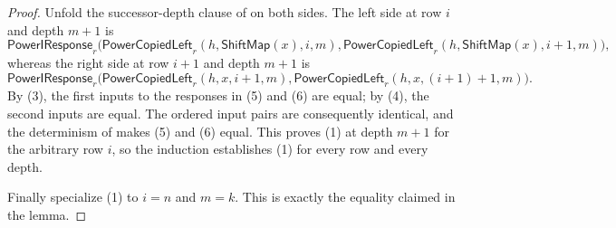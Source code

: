\begin{proof}
Unfold the successor-depth clause of  on both
sides.  The left side at row $i$ and depth $m+1$ is
\[
\mathsf{PowerIResponse}_r\bigl(
 \mathsf{PowerCopiedLeft}_r(h,\mathsf{ShiftMap}(x),i,m),
 \mathsf{PowerCopiedLeft}_r(h,\mathsf{ShiftMap}(x),i+1,m)\bigr),
\tag{5}
\]
whereas the right side at row $i+1$ and depth $m+1$ is
\[
\mathsf{PowerIResponse}_r\bigl(
 \mathsf{PowerCopiedLeft}_r(h,x,i+1,m),
 \mathsf{PowerCopiedLeft}_r(h,x,(i+1)+1,m)\bigr).
\tag{6}
\]
By (3), the first inputs to the responses in (5) and (6) are equal; by
(4), the second inputs are equal.  The ordered input pairs are consequently
identical, and the determinism of  makes (5) and
(6) equal.  This proves (1) at depth $m+1$ for the arbitrary row $i$, so
the induction establishes (1) for every row and every depth.

Finally specialize (1) to $i=n$ and $m=k$.  This is exactly the equality
claimed in the lemma.
\end{proof}
